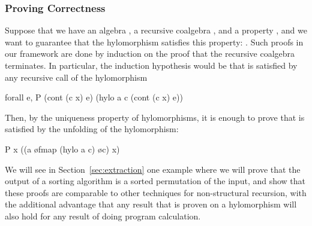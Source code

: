 \documentclass[a4paper,UKenglish,cleveref, autoref, thm-restate]{lipics-v2021}
\begin{document}
\subsubsection{Proving Correctness}

Suppose that we have an algebra , a recursive coalgebra
, and a property , and we want to
guarantee that the hylomorphism satisfies this property:
.
Such proofs in our framework are done by induction on the proof that the
recursive coalgebra terminates. In particular, the induction hypothesis would be
that  is satisfied by any recursive call of the hylomorphism
\begin{coqcode}
forall e, P (cont (c x) e) (hylo a c (cont (c x) e))
\end{coqcode}
\noindent
Then, by the uniqueness property of hylomorphisms, it is enough to prove that
 is satisfied by the unfolding of the hylomorphism:
\begin{coqcode}
P x ((a \o fmap (hylo a c) \o c) x)
\end{coqcode}
We will see in Section~\ref{sec:extraction} one example where we will prove that
the output of a sorting algorithm is a sorted permutation of the input, and
show that these proofs are comparable to other techniques for non-structural
recursion, with the additional advantage that any result that is proven on a
hylomorphism will also hold for any result of doing program calculation.
\end{document}
